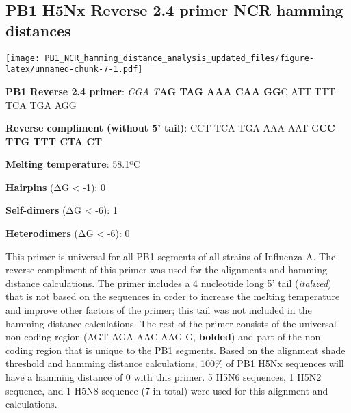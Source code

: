 \documentclass[
]{article}
\newenvironment{Shaded}{\begin{snugshade}}{\end{snugshade}}
\newcommand{\AttributeTok}[1]{\textcolor[rgb]{0.77,0.63,0.00}{#1}}
\newcommand{\DecValTok}[1]{\textcolor[rgb]{0.00,0.00,0.81}{#1}}
\newcommand{\FunctionTok}[1]{\textcolor[rgb]{0.00,0.00,0.00}{#1}}
\newcommand{\NormalTok}[1]{#1}
\newcommand{\OtherTok}[1]{\textcolor[rgb]{0.56,0.35,0.01}{#1}}
\newcommand{\SpecialCharTok}[1]{\textcolor[rgb]{0.00,0.00,0.00}{#1}}
\newcommand{\StringTok}[1]{\textcolor[rgb]{0.31,0.60,0.02}{#1}}
\begin{document}
\hypertarget{pb1-h5nx-reverse-2.4-primer-ncr-hamming-distances}{%
\subsection{PB1 H5Nx Reverse 2.4 primer NCR hamming
distances}\label{pb1-h5nx-reverse-2.4-primer-ncr-hamming-distances}}

\begin{Shaded}
\end{Shaded}

\texttt{[image: PB1\_NCR\_hamming\_distance\_analysis\_updated\_files/figure-latex/unnamed-chunk-7-1.pdf]}

\textbf{PB1 Reverse 2.4 primer}: \emph{CGA T}\textbf{AG TAG AAA CAA GG}C
ATT TTT TCA TGA AGG

\textbf{Reverse compliment (without 5' tail)}: CCT TCA TGA AAA AAT
G\textbf{CC TTG TTT CTA CT}

\textbf{Melting temperature}: 58.1ºC

\textbf{Hairpins} (ΔG \textless{} -1): 0

\textbf{Self-dimers} (ΔG \textless{} -6): 1

\textbf{Heterodimers} (ΔG \textless{} -6): 0

This primer is universal for all PB1 segments of all strains of
Influenza A. The reverse compliment of this primer was used for the
alignments and hamming distance calculations. The primer includes a 4
nucleotide long 5' tail (\emph{italized}) that is not based on the
sequences in order to increase the melting temperature and improve other
factors of the primer; this tail was not included in the hamming
distance calculations. The rest of the primer consists of the universal
non-coding region (AGT AGA AAC AAG G, \textbf{bolded}) and part of the
non-coding region that is unique to the PB1 segments. Based on the
alignment shade threshold and hamming distance calculations, 100\% of
PB1 H5Nx sequences will have a hamming distance of 0 with this primer. 5
H5N6 sequences, 1 H5N2 sequence, and 1 H5N8 sequence (7 in total) were
used for this alignment and calculations.
\end{document}
